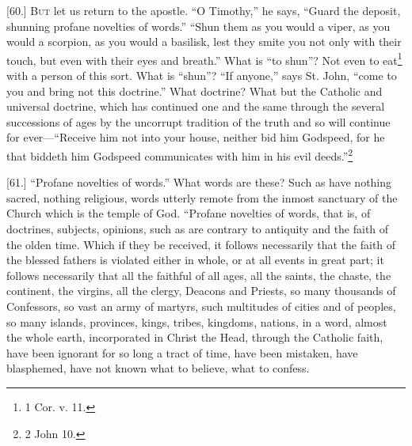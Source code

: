 
[60.] \textsc{But} let us return to the apostle. “O Timothy,” he says, “Guard the deposit, shunning profane novelties of words.” “Shun them as you would a viper, as you would a scorpion, as you would a basilisk, lest they smite you not only with their touch, but even with their eyes and breath.” What is “to shun”? Not even to eat\footnote{1 Cor. v. 11.} with a person of this sort. What is “shun”? “If anyone,” says St. John, “come to you and bring not this doctrine.” What doctrine? What but the Catholic and universal doctrine, which has continued one and the same through the several successions of ages by the uncorrupt tradition of the truth and so will continue for ever—“Receive him not into your house, neither bid him Godspeed, for he that biddeth him Godspeed communicates with him in his evil deeds.”\footnote{2 John 10.}

[61.] “Profane novelties of words.” What words are these? Such as have nothing sacred, nothing religious, words utterly remote from the inmost sanctuary of the Church which is the temple of God. “Profane novelties of words, that is, of doctrines, subjects, opinions, such as are contrary to antiquity and the faith of the olden time. Which if they be received, it follows necessarily that the faith of the blessed fathers is violated either in whole, or at all events in great part; it follows necessarily that all the faithful of all ages, all the saints, the chaste, the continent, the virgins, all the clergy, Deacons and Priests, so many thousands of Confessors, so vast an army of martyrs, such multitudes of cities and of peoples, so many islands, provinces, kings, tribes, kingdoms, nations, in a word, almost the whole earth, incorporated in Christ the Head, through the Catholic faith, have been ignorant for so long a tract of time, have been mistaken, have blasphemed, have not known what to believe, what to confess.

